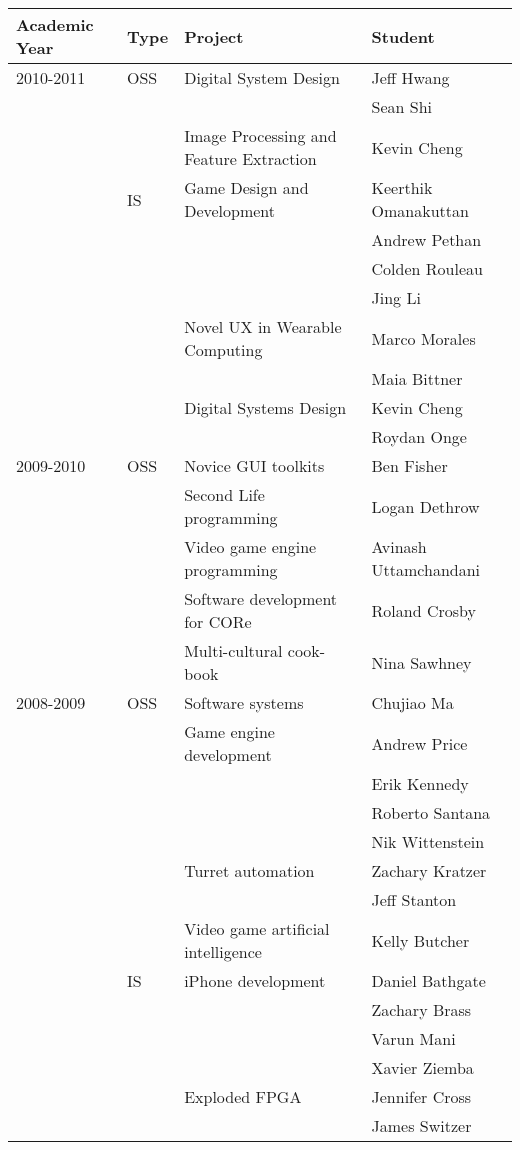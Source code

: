 \documentclass[line]{res}
\begin{document}
\begin{resume}
	\begin{longtable}
		{ | l | l | l | l |} \hline \textbf{Academic Year} & \textbf{Type} & \textbf{Project} & \textbf{Student} \\
		\hline
		
		2010-2011 & OSS & Digital System Design & Jeff Hwang \\
		& & & Sean Shi \\
		& & Image Processing and Feature Extraction & Kevin Cheng \\
		& IS & Game Design and Development & Keerthik Omanakuttan \\
		& & & Andrew Pethan \\
		& & & Colden Rouleau \\
		& & & Jing Li \\
		& & Novel UX in Wearable Computing & Marco Morales \\
		& & & Maia Bittner \\
		& & Digital Systems Design & Kevin Cheng \\
		& & & Roydan Onge \\
		
		\hline
		
		2009-2010 & OSS & Novice GUI toolkits & Ben Fisher \\
		& & Second Life programming & Logan Dethrow \\
		& & Video game engine programming & Avinash Uttamchandani \\
		& & Software development for CORe & Roland Crosby \\
		& & Multi-cultural cook-book & Nina Sawhney \\
		\hline
		
		2008-2009 & OSS & Software systems & Chujiao Ma \\
		& & Game engine development & Andrew Price \\
		& & & Erik Kennedy \\
		& & & Roberto Santana \\
		& & & Nik Wittenstein \\
		& & Turret automation & Zachary Kratzer \\
		& & & Jeff Stanton \\
		& & Video game artificial intelligence & Kelly Butcher \\
		& IS & iPhone development & Daniel Bathgate \\
		& & & Zachary Brass \\
		& & & Varun Mani \\
		& & & Xavier Ziemba \\
		& & Exploded FPGA & Jennifer Cross \\
		& & & James Switzer \\
		\hline
		

\end{longtable}
\end{resume}
\end{document}
